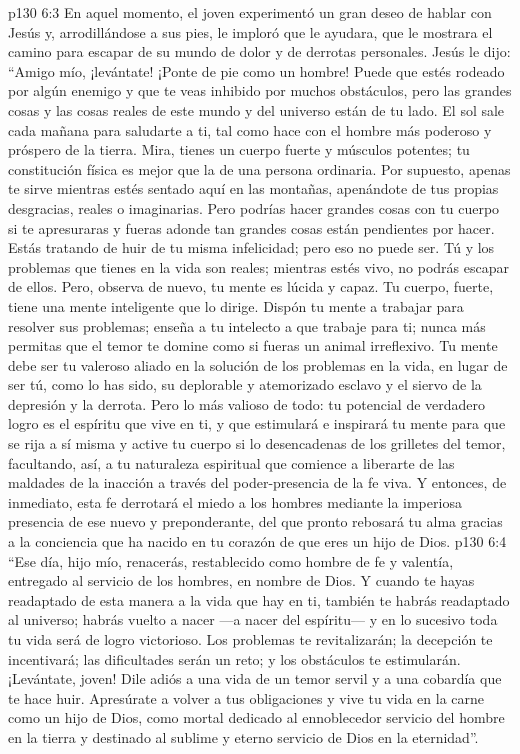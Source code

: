 \vs p130 6:3 En aquel momento, el joven experimentó un gran deseo de hablar con Jesús y, arrodillándose a sus pies, le imploró que le ayudara, que le mostrara el camino para escapar de su mundo de dolor y de derrotas personales. Jesús le dijo: “Amigo mío, ¡levántate! ¡Ponte de pie como un hombre! Puede que estés rodeado por algún enemigo y que te veas inhibido por muchos obstáculos, pero las grandes cosas y las cosas reales de este mundo y del universo están de tu lado. El sol sale cada mañana para saludarte a ti, tal como hace con el hombre más poderoso y próspero de la tierra. Mira, tienes un cuerpo fuerte y músculos potentes; tu constitución física es mejor que la de una persona ordinaria. Por supuesto, apenas te sirve mientras estés sentado aquí en las montañas, apenándote de tus propias desgracias, reales o imaginarias. Pero podrías hacer grandes cosas con tu cuerpo si te apresuraras y fueras adonde tan grandes cosas están pendientes por hacer. Estás tratando de huir de tu misma infelicidad; pero eso no puede ser. Tú y los problemas que tienes en la vida son reales; mientras estés vivo, no podrás escapar de ellos. Pero, observa de nuevo, tu mente es lúcida y capaz. Tu cuerpo, fuerte, tiene una mente inteligente que lo dirige. Dispón tu mente a trabajar para resolver sus problemas; enseña a tu intelecto a que trabaje para ti; nunca más permitas que el temor te domine como si fueras un animal irreflexivo. Tu mente debe ser tu valeroso aliado en la solución de los problemas en la vida, en lugar de ser tú, como lo has sido, su deplorable y atemorizado esclavo y el siervo de la depresión y la derrota. Pero lo más valioso de todo: tu potencial de verdadero logro es el espíritu que vive en ti, y que estimulará e inspirará tu mente para que se rija a sí misma y active tu cuerpo si lo desencadenas de los grilletes del temor, facultando, así, a tu naturaleza espiritual que comience a liberarte de las maldades de la inacción a través del poder\hyp{}presencia de la fe viva. Y entonces, de inmediato, esta fe derrotará el miedo a los hombres mediante la imperiosa presencia de ese  nuevo y preponderante, del que pronto rebosará tu alma gracias a la conciencia que ha nacido en tu corazón de que eres un hijo de Dios.
\vs p130 6:4 “Ese día, hijo mío, renacerás, restablecido como hombre de fe y valentía, entregado al servicio de los hombres, en nombre de Dios. Y cuando te hayas readaptado de esta manera a la vida que hay en ti, también te habrás readaptado al universo; habrás vuelto a nacer ---a nacer del espíritu--- y en lo sucesivo toda tu vida será de logro victorioso. Los problemas te revitalizarán; la decepción te incentivará; las dificultades serán un reto; y los obstáculos te estimularán. ¡Levántate, joven! Dile adiós a una vida de un temor servil y a una cobardía que te hace huir. Apresúrate a volver a tus obligaciones y vive tu vida en la carne como un hijo de Dios, como mortal dedicado al ennoblecedor servicio del hombre en la tierra y destinado al sublime y eterno servicio de Dios en la eternidad”.
